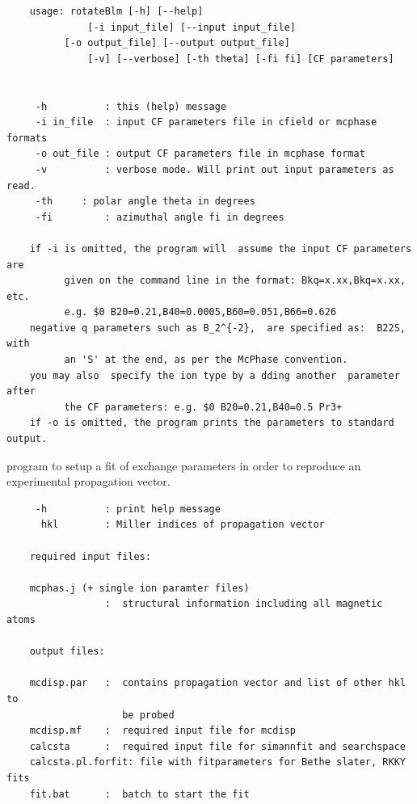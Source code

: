\begin{description}
\begin{verbatim}
    usage: rotateBlm [-h] [--help] 
              [-i input_file] [--input input_file]
	      [-o output_file] [--output output_file]
              [-v] [--verbose] [-th theta] [-fi fi] [CF parameters]

          
     -h          : this (help) message
     -i in_file  : input CF parameters file in cfield or mcphase formats
     -o out_file : output CF parameters file in mcphase format
     -v          : verbose mode. Will print out input parameters as read.
     -th	 : polar angle theta in degrees
     -fi         : azimuthal angle fi in degrees

    if -i is omitted, the program will  assume the input CF parameters are
          given on the command line in the format: Bkq=x.xx,Bkq=x.xx, etc.
          e.g. $0 B20=0.21,B40=0.0005,B60=0.051,B66=0.626
    negative q parameters such as B_2^{-2},  are specified as:  B22S, with 
          an 'S' at the end, as per the McPhase convention.
    you may also  specify the ion type by a dding another  parameter after
          the CF parameters: e.g. $0 B20=0.21,B40=0.5 Pr3+
    if -o is omitted, the program prints the parameters to standard output.
  \end{verbatim}
\item[\prg   setup\_jqfit\index{setup_jqfit}\label{setup_jqfit}{[-h]} 
{[--help]} h k l:] 
program to setup a fit of exchange parameters in order to reproduce an experimental propagation vector.
\begin{verbatim}
     -h          : print help message
      hkl        : Miller indices of propagation vector

    required input files:

    mcphas.j (+ single ion paramter files)
                 :  structural information including all magnetic atoms

    output files:

    mcdisp.par   :  contains propagation vector and list of other hkl to
                    be probed
    mcdisp.mf    :  required input file for mcdisp
    calcsta      :  required input file for simannfit and searchspace
    calcsta.pl.forfit: file with fitparameters for Bethe slater, RKKY fits
    fit.bat      :  batch to start the fit

   
\end{verbatim}


\end{description}
